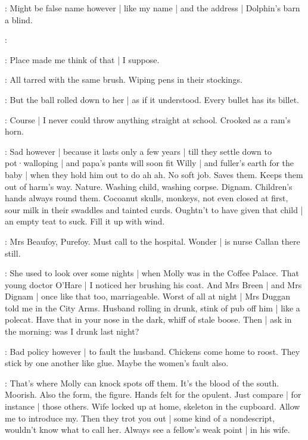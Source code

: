 \BloomToday:
Might be false name however |
like my name |
and the address |
Dolphin's barn a blind.

:

\BloomCurrent:
Place made me think of that |
I suppose.

\BloomAbstract:
All tarred with the same brush.
Wiping pens in their stockings.%

\BloomCurrent:
But the ball rolled down to her |
as if it understood.
Every bullet has its billet.

\BloomHist:
Course |
I never could throw anything straight at school.
Crooked as a ram's horn.

\BloomAbstract:
Sad however |
because it lasts only a few years |
till they settle down to pot·walloping |
and papa's pants will soon fit Willy |
and fuller's earth for the baby |
when they hold him out to do ah ah.
No soft job.
Saves them.
Keeps them out of harm's way.
Nature.
Washing child,
washing corpse.
Dignam.
Children's hands always round them.
Cocoanut skulls,
monkeys,
not even closed at first,
sour milk in their swaddles and tainted curds.
Oughtn't to have given that child |
an empty teat to suck.
Fill it up with wind.

\BloomToday:
Mrs Beaufoy,
Purefoy.
Must call to the hospital.
Wonder |
is nurse Callan there still.%

\BloomHist:
She used to look over some nights |
when Molly was in the Coffee Palace.
That young doctor O'Hare |
I noticed her brushing his coat.
And Mrs Breen |
and Mrs Dignam |
once like that too,
marriageable.
Worst of all at night |
Mrs Duggan told me in the City Arms.
Husband rolling in drunk,
stink of pub off him |
like a polecat.
Have that in your nose in the dark,
whiff of stale boose.
Then |
ask in the morning:
was I drunk last night?

\BloomAbstract:
Bad policy however |
to fault the husband.
Chickens come home to roost.
They stick by one another like glue.
Maybe the women's fault also.

\BloomHist:
That's where Molly can knock spots off them.
It's the blood of the south.
Moorish.
Also the form,
the figure.
Hands felt for the opulent.
Just compare |
for instance |
those others.%
Wife locked up at home,
skeleton in the cupboard.
Allow me to introduce my.
Then they trot you out |
some kind of a nondescript,
wouldn't know what to call her.
Always see a fellow's weak point |
in his wife.

